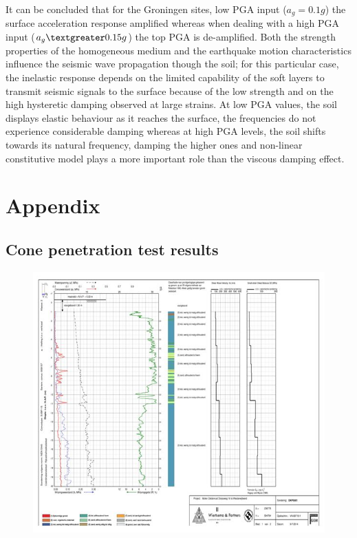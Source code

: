\documentclass[10pt,a4paper]{report}
\begin{document}
It can be concluded that for the Groningen sites, low PGA input ($a_g=0.1g$) the surface acceleration response amplified whereas when dealing with a high PGA input ($a_g\textgreater0.15g$) the top PGA is de-amplified. Both the strength properties of the homogeneous medium and the earthquake motion characteristics influence the seismic wave propagation though the soil; for this particular case, the inelastic response depends on the limited capability of the soft layers to transmit seismic signals to the surface because of the low strength and on the high hysteretic damping observed at large strains. At low PGA values, the soil displays elastic behaviour as it reaches the surface, the frequencies do not experience considerable damping whereas at high PGA levels, the soil shifts towards its natural frequency, damping the higher ones and non-linear constitutive model plays a more important role than the viscous damping effect.



\newpage
\appendix
{}
\part{Appendix}
\chapter{Cone penetration test results} \label{App:AppendixA}

\begin{figure}[h!]
	\centering
	\includegraphics[width=0.85\linewidth]{"cpt"}
\end{figure}
\end{document}
